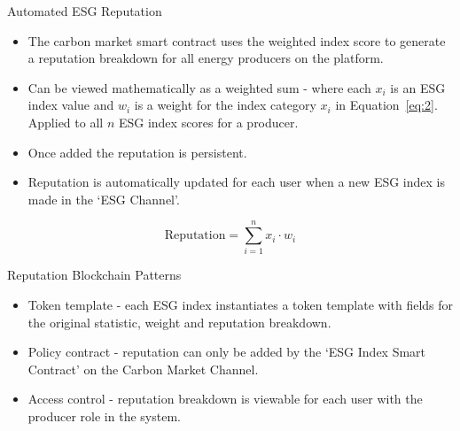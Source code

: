 \begin{frame}{Automated ESG Reputation}
    \begin{itemize}
        \item The carbon market smart contract uses the weighted index
              score to generate a reputation breakdown for all energy producers
              on the platform.
        \item Can be viewed mathematically as a weighted sum - where each
              $x_i$ is an ESG index value and $w_i$ is a weight for the index
              category $x_i$ in Equation~\ref{eq:2}. Applied to all $n$
              ESG index scores for a producer.
        \item Once added the reputation is persistent.
        \item Reputation is automatically updated for each user when a new
              ESG index is made in the `ESG Channel'.
    \end{itemize}
    \begin{equation}
        \text{Reputation} = \sum_{i=1}^{n}x_i \cdot w_i
        \label{eq:2}
    \end{equation}
\end{frame}
\begin{frame}{Reputation Blockchain Patterns}
    \begin{itemize}
        \item Token template - each ESG index instantiates a token template
              with fields for the original statistic, weight and reputation
              breakdown.
        \item Policy contract - reputation can only be added by the `ESG Index
              Smart Contract' on the Carbon Market Channel.
        \item Access control - reputation breakdown is viewable for each
              user with the producer role in the system.
    \end{itemize}
\end{frame}